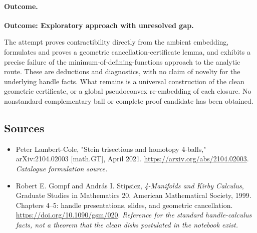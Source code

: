 \documentclass[11pt,a4paper]{article}
\numberwithin{equation}{section}
\begin{document}
\paragraph{Outcome.}
\textbf{Outcome: Exploratory approach with unresolved gap.}

The attempt proves contractibility directly from the ambient embedding,
formulates and proves a geometric cancellation-certificate lemma, and
exhibits a precise failure of the minimum-of-defining-functions approach
to the analytic route. These are deductions and diagnostics, with no
claim of novelty for the underlying handle facts. What remains is a
universal construction of the clean geometric certificate, or a global
pseudoconvex re-embedding of each closure. No nonstandard complementary
ball or complete proof candidate has been obtained.

\subsection{Sources}
\begin{itemize}\raggedright
\item[\textnormal{[S1]}]\hypertarget{source:3410:1}{} Peter Lambert-Cole, "Stein trisections and homotopy 4-balls," arXiv:2104.02003 [math.GT], April 2021.
\url{https://arxiv.org/abs/2104.02003}.
{\small\textit{Catalogue formulation source.}}
\item[\textnormal{[E1]}]\hypertarget{extra:3410:1}{} Robert E. Gompf and Andr\'as I. Stipsicz, \emph{4-Manifolds and Kirby Calculus}, Graduate Studies in Mathematics 20, American Mathematical Society, 1999. Chapters 4--5: handle presentations, slides, and geometric cancellation.
\url{https://doi.org/10.1090/gsm/020}.
{\small\textit{Reference for the standard handle-calculus facts, not a theorem that the clean disks postulated in the notebook exist.}}
\end{itemize}
\end{document}
